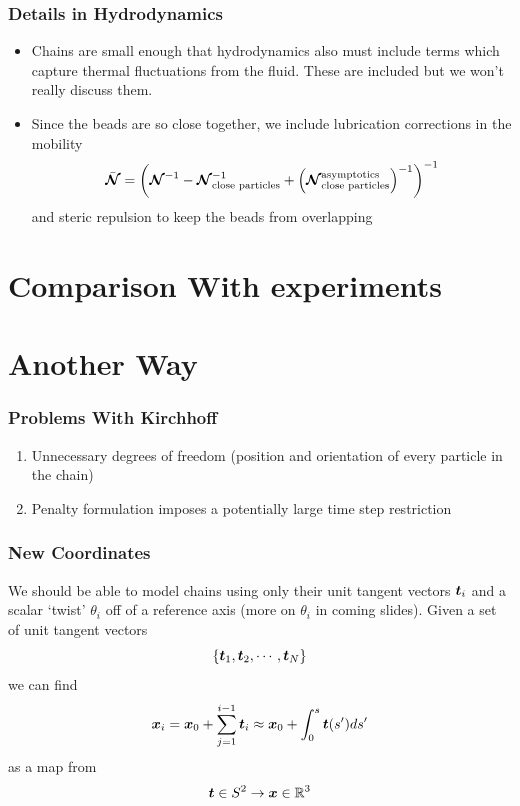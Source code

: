 \documentclass{beamer}
\begin{document}
\begin{frame}
\frametitle{Details in Hydrodynamics}
\begin{itemize}
\item Chains are small enough that hydrodynamics also must include terms which capture thermal fluctuations from the fluid. These are included but we won't really discuss them.
\item Since the beads are so close together, we include lubrication corrections in the mobility
\[
\bar{\boldsymbol{\mathcal{N}}} = \left( \boldsymbol{\mathcal{N}}^{-1} - \boldsymbol{\mathcal{N}}_{\text{close particles}}^{-1} + \left(\boldsymbol{\mathcal{N}}_{\text{close particles}}^{\text{asymptotics}}\right)^{-1} \right)^{-1}
\]
and steric repulsion to keep the beads from overlapping
\end{itemize}
\end{frame}


\section{Comparison With experiments}

\section{Another Way}
\begin{frame}
\frametitle{Problems With Kirchhoff}
\begin{enumerate}
\item Unnecessary degrees of freedom (position and orientation of every particle in the chain)
\item Penalty formulation imposes a potentially large time step restriction 
\end{enumerate}
\end{frame}

\begin{frame}
\frametitle{New Coordinates}
We should be able to model chains using only their unit tangent vectors $\boldsymbol{t}_i$ and a scalar `twist' $\theta_i$ off of a reference axis (more on $\theta_i$ in coming slides). Given a set of unit tangent vectors 
\[
\left\{ \boldsymbol{t}_1,  \boldsymbol{t}_2, \cdots ,  \boldsymbol{t}_N \right\}
\]
we can find 
\[
\boldsymbol{x}_{i} = \boldsymbol{x}_{0} + \displaystyle \sum_{j = 1}^{i-1} \boldsymbol{t}_i \approx \boldsymbol{x}_{0} + \displaystyle \int_{0}^{s} \boldsymbol{t}(s') ds'
\]
as a map from 
\[
\boldsymbol{t} \in S^{2} \rightarrow \boldsymbol{x} \in \mathbb{R}^{3}
\]
\end{frame}
\end{document}
